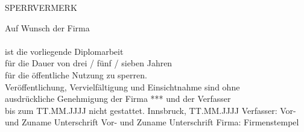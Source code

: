 
\begin{center}
	
{\LARGE SPERRVERMERK}

\vfill
Auf Wunsch der Firma \\ 
\vfill
{\large \myprojectpartner } \\
\vfill
 ist die vorliegende Diplomarbeit \\

für die Dauer von drei / fünf / sieben Jahren \\
für die öffentliche Nutzung zu sperren. \\
Veröffentlichung, Vervielfältigung und Einsichtnahme sind ohne \\ 
ausdrückliche Genehmigung der Firma *** und der Verfasser \\
bis zum TT.MM.JJJJ nicht gestattet.
\vfill
Innsbruck, TT.MM.JJJJ
\vfill
Verfasser:
\vfill\vfill
Vor- und Zuname	 \hspace{3cm}	Unterschrift
\vfill\vfill
Vor- und Zuname	 \hspace{3cm}	Unterschrift
\vfill\vfill
Firma:  \hspace{3cm} Firmenstempel


\end{center}